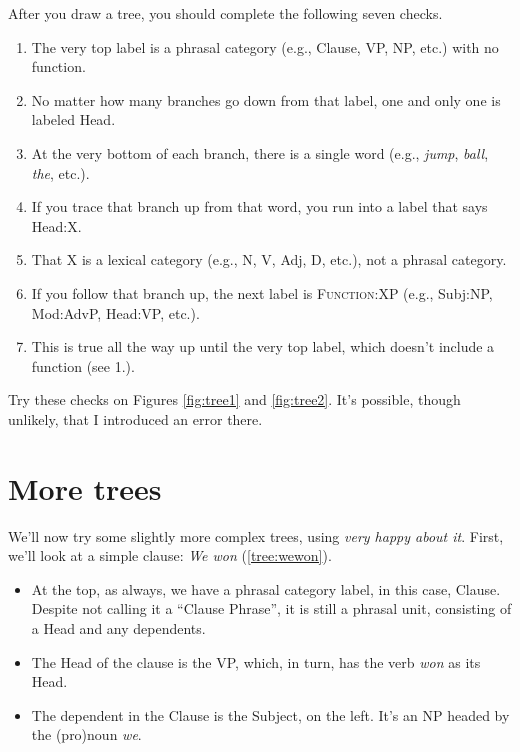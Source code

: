 After you draw a tree, you should complete the following seven checks.

\begin{enumerate}[noitemsep]
    \item The very top label is a phrasal category (e.g., Clause, VP, NP, etc.) with no function.
    \item No matter how many branches go down from that label, one and only one is labeled Head.
    \item At the very bottom of each branch, there is a single word (e.g., \textit{jump}, \textit{ball}, \textit{the}, etc.).
    \item If you trace that branch up from that word, you run into a label that says Head:X.
    \item That X is a lexical category (e.g., N, V, Adj, D, etc.), not a phrasal category.
    \item If you follow that branch up, the next label is \textsc{Function}:XP (e.g., Subj:NP, Mod:AdvP, Head:VP, etc.).
    \item This is true all the way up until the very top label, which doesn't include a function (see 1.).
\end{enumerate}

Try these checks on Figures \ref{fig:tree1} and \ref{fig:tree2}. It's possible, though unlikely, that I introduced an error there.

\section{More trees}\label{sec:more trees}

We'll now try some slightly more complex trees, using \textit{very happy about it}. First, we'll look at a simple clause: \textit{We won} (\ref{tree:wewon}).
\begin{itemize}[noitemsep]
    \item At the top, as always, we have a phrasal category label, in this case, Clause. Despite not calling it a ``Clause Phrase'', it is still a phrasal unit, consisting of a Head and any dependents.
    \item The Head of the clause is the VP, which, in turn, has the verb \textit{won} as its Head.
    \item The dependent in the Clause is the Subject, on the left. It's an NP headed by the (pro)noun \textit{we}.
\end{itemize}

